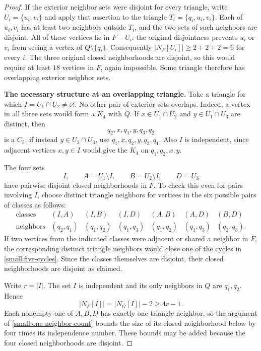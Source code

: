 \begin{proof}
If the exterior neighbor sets were disjoint for every triangle,
write $U_i=\{u_i,v_i\}$ and apply that assertion to the triangle
$T_i=\{q_i,u_i,v_i\}$. Each of $u_i,v_i$ has at least two neighbors
outside $T_i$, and the two sets of such neighbors are disjoint.
All of these vertices lie in $F-U_i$: the original disjointness
prevents $u_i$ or $v_i$ from seeing a vertex of $Q\setminus\{q_i\}$.
Consequently $|N_F[U_i]|\ge2+2+2=6$ for every $i$. The three
original closed neighborhoods are disjoint, so this would require
at least $18$ vertices in $F$, again impossible. Some triangle
therefore has overlapping exterior neighbor sets.

\medskip
\noindent\textbf{The necessary structure at an overlapping triangle.}
Take a triangle for which
$I=U_1\cap U_2\ne\varnothing$. No other pair of exterior sets
overlaps. Indeed, a vertex in all three sets would form a $K_4$
with $Q$. If $x\in U_1\cap U_2$ and
$y\in U_1\cap U_3$ are distinct, then
\[
  q_2,x,q_1,y,q_3,q_2
\]
is a $C_5$; if instead $y\in U_2\cap U_3$, use
$q_1,x,q_2,y,q_3,q_1$. Also $I$ is independent, since adjacent
vertices $x,y\in I$ would give the $K_4$ on $q_1,q_2,x,y$.

The four sets
\[
  I,\qquad A=U_1\setminus I,\qquad
  B=U_2\setminus I,\qquad D=U_3
\]
have pairwise disjoint closed neighborhoods in $F$. To check this
even for pairs involving $I$, choose distinct triangle neighbors
for vertices in the six possible pairs of classes as follows:
\[
\begin{array}{c|cccccc}
\text{classes}&(I,A)&(I,B)&(I,D)&(A,B)&(A,D)&(B,D)\\ \hline
\text{neighbors}&(q_2,q_1)&(q_1,q_2)&(q_1,q_3)&
                  (q_1,q_2)&(q_1,q_3)&(q_2,q_3).
\end{array}
\]
If two vertices from the indicated classes were adjacent or shared
a neighbor in $F$, the corresponding distinct triangle neighbors
would close one of the cycles in \eqref{small:five-cycles}. Since
the classes themselves are disjoint, their closed neighborhoods
are disjoint as claimed.

Write $r=|I|$. The set $I$ is independent and its only neighbors in
$Q$ are $q_1,q_2$. Hence
\begin{equation}
  |N_F[I]|=|N_G[I]|-2\ge4r-1.
  \label{small:overlap-count}
\end{equation}
Each nonempty one of $A,B,D$ has exactly one triangle neighbor,
so the argument of \eqref{small:one-neighbor-count} bounds the
size of its closed neighborhood below by four times its
independence number. These bounds may be added because the four
closed neighborhoods are disjoint.


\end{proof}
